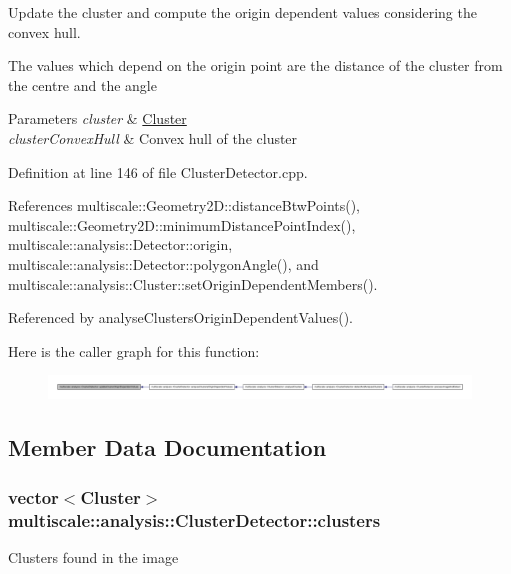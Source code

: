 \-Update the cluster and compute the origin dependent values considering the convex hull. 

\-The values which depend on the origin point are the distance of the cluster from the centre and the angle


\begin{DoxyParams}{\-Parameters}
{\em cluster} & \hyperlink{classmultiscale_1_1analysis_1_1Cluster}{\-Cluster} \\
\hline
{\em cluster\-Convex\-Hull} & \-Convex hull of the cluster \\
\hline
\end{DoxyParams}


\-Definition at line 146 of file \-Cluster\-Detector.\-cpp.



\-References multiscale\-::\-Geometry2\-D\-::distance\-Btw\-Points(), multiscale\-::\-Geometry2\-D\-::minimum\-Distance\-Point\-Index(), multiscale\-::analysis\-::\-Detector\-::origin, multiscale\-::analysis\-::\-Detector\-::polygon\-Angle(), and multiscale\-::analysis\-::\-Cluster\-::set\-Origin\-Dependent\-Members().



\-Referenced by analyse\-Clusters\-Origin\-Dependent\-Values().



\-Here is the caller graph for this function\-:
\nopagebreak
\begin{figure}[H]
\begin{center}
\leavevmode
\includegraphics[width=350pt]{classmultiscale_1_1analysis_1_1ClusterDetector_ac7e008a7674205095f94b91c8d7cdccc_icgraph}
\end{center}
\end{figure}




\subsection{\-Member \-Data \-Documentation}
\hypertarget{classmultiscale_1_1analysis_1_1ClusterDetector_aa81a8649bc743389c2fc1919d47eb5b3}{
\subsubsection[{clusters}]{\setlength{\rightskip}{0pt plus 5cm}vector$<${\bf \-Cluster}$>$ {\bf multiscale\-::analysis\-::\-Cluster\-Detector\-::clusters}}}\label{classmultiscale_1_1analysis_1_1ClusterDetector_aa81a8649bc743389c2fc1919d47eb5b3}
\-Clusters found in the image 


